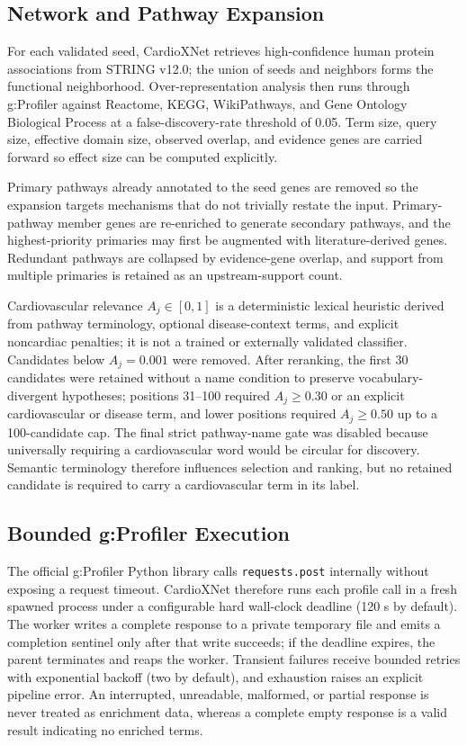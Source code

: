 \documentclass{ieeeaccess}
\newcommand{\code}[1]{{\fontseries{m}\selectfont\texttt{#1}}}
\begin{document}
\subsection{Network and Pathway Expansion}
For each validated seed, CardioXNet retrieves high-confidence human protein associations from STRING v12.0; the union of seeds and neighbors forms the functional neighborhood. Over-representation analysis then runs through g:Profiler against Reactome, KEGG, WikiPathways, and Gene Ontology Biological Process \cite{milacic2024reactome,kanehisa2023kegg,agrawal2024wikipathways,go2023} at a false-discovery-rate threshold of 0.05. Term size, query size, effective domain size, observed overlap, and evidence genes are carried forward so effect size can be computed explicitly.

Primary pathways already annotated to the seed genes are removed so the expansion targets mechanisms that do not trivially restate the input. Primary-pathway member genes are re-enriched to generate secondary pathways, and the highest-priority primaries may first be augmented with literature-derived genes. Redundant pathways are collapsed by evidence-gene overlap, and support from multiple primaries is retained as an upstream-support count.

Cardiovascular relevance $A_j\in[0,1]$ is a deterministic lexical heuristic derived from pathway terminology, optional disease-context terms, and explicit noncardiac penalties; it is not a trained or externally validated classifier. Candidates below $A_j=0.001$ were removed. After reranking, the first 30 candidates were retained without a name condition to preserve vocabulary-divergent hypotheses; positions 31--100 required $A_j\geq0.30$ or an explicit cardiovascular or disease term, and lower positions required $A_j\geq0.50$ up to a 100-candidate cap. The final strict pathway-name gate was disabled because universally requiring a cardiovascular word would be circular for discovery. Semantic terminology therefore influences selection and ranking, but no retained candidate is required to carry a cardiovascular term in its label.

\subsection{Bounded g:Profiler Execution}
The official g:Profiler Python library calls \code{requests.post} internally without exposing a request timeout. CardioXNet therefore runs each profile call in a fresh spawned process under a configurable hard wall-clock deadline (120 s by default). The worker writes a complete response to a private temporary file and emits a completion sentinel only after that write succeeds; if the deadline expires, the parent terminates and reaps the worker. Transient failures receive bounded retries with exponential backoff (two by default), and exhaustion raises an explicit pipeline error. An interrupted, unreadable, malformed, or partial response is never treated as enrichment data, whereas a complete empty response is a valid result indicating no enriched terms.
\end{document}
